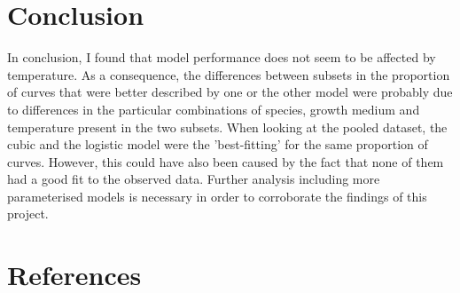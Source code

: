 \documentclass[a4paper]{article}
\begin{document}
\section{Conclusion}
In conclusion, I found that model performance does not seem to be affected by temperature. As a consequence, the differences between subsets in the proportion of curves that were better described by one or the other model were probably due to differences in the particular combinations of species, growth medium and temperature present in the two subsets. When looking at the pooled dataset, the cubic and the logistic model were the 'best-fitting' for the same proportion of curves. However, this could have also been caused by the fact that none of them had a good fit to the observed data. Further analysis including more parameterised models is necessary in order to corroborate the findings of this project.

\pagebreak

\section{References}


\pagebreak
\end{document}
